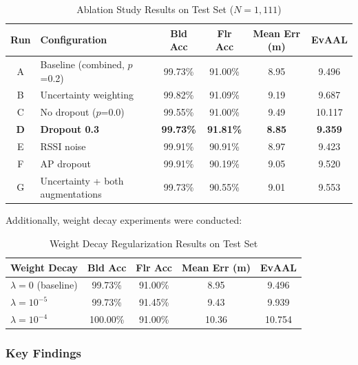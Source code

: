 \begin{table}[htbp]
\centering
\caption{Ablation Study Results on Test Set ($N=1{,}111$)}
\label{tab:ablation_results}
\begin{tabular}{clcccc}
\hline
\textbf{Run} & \textbf{Configuration} & \textbf{Bld Acc} & \textbf{Flr Acc} & \textbf{Mean Err (m)} & \textbf{EvAAL} \\
\hline
A & Baseline (combined, $p$=0.2) & 99.73\% & 91.00\% & 8.95 & 9.496 \\
B & Uncertainty weighting & 99.82\% & 91.09\% & 9.19 & 9.687 \\
C & No dropout ($p$=0.0) & 99.55\% & 91.00\% & 9.49 & 10.117 \\
\textbf{D} & \textbf{Dropout 0.3} & \textbf{99.73\%} & \textbf{91.81\%} & \textbf{8.85} & \textbf{9.359} \\
E & RSSI noise & 99.91\% & 90.91\% & 8.97 & 9.423 \\
F & AP dropout & 99.91\% & 90.19\% & 9.05 & 9.520 \\
G & Uncertainty + both augmentations & 99.73\% & 90.55\% & 9.01 & 9.553 \\
\hline
\end{tabular}
\end{table}

Additionally, weight decay experiments were conducted:
\begin{table}[htbp]
\centering
\caption{Weight Decay Regularization Results on Test Set}
\label{tab:weight_decay}
\begin{tabular}{lcccc}
\hline
\textbf{Weight Decay} & \textbf{Bld Acc} & \textbf{Flr Acc} & \textbf{Mean Err (m)} & \textbf{EvAAL} \\
\hline
$\lambda = 0$ (baseline) & 99.73\% & 91.00\% & 8.95 & 9.496 \\
$\lambda = 10^{-5}$ & 99.73\% & 91.45\% & 9.43 & 9.939 \\
$\lambda = 10^{-4}$ & 100.00\% & 91.00\% & 10.36 & 10.754 \\
\hline
\end{tabular}
\end{table}

\subsubsection{Key Findings}

